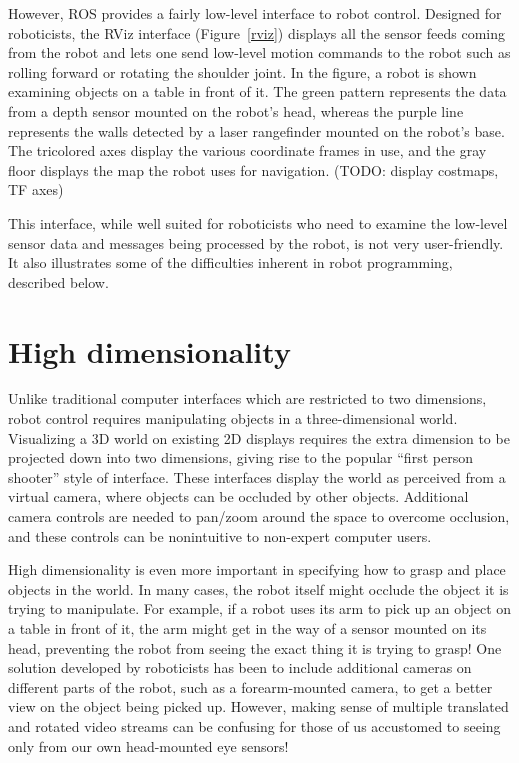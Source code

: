 \documentclass[11pt,twocolumn]{article}
\begin{document}
However, ROS provides a fairly low-level interface to robot control. Designed for roboticists, the RViz interface (Figure~\ref{rviz}) displays all the sensor feeds coming from the robot and lets one send low-level motion commands to the robot such as rolling forward or rotating the shoulder joint. In the figure, a robot is shown examining objects on a table in front of it. The green pattern represents the data from a depth sensor mounted on the robot's head, whereas the purple line represents the walls detected by a laser rangefinder mounted on the robot's base. The tricolored axes display the various coordinate frames in use, and the gray floor displays the map the robot uses for navigation. (TODO: display costmaps, TF axes)

This interface, while well suited for roboticists who need to examine the low-level sensor data and messages being processed by the robot, is not very user-friendly. It also illustrates some of the difficulties inherent in robot programming, described below.

\section{High dimensionality}


Unlike traditional computer interfaces which are restricted to two dimensions, robot control requires manipulating objects in a three-dimensional world. Visualizing a 3D world on existing 2D displays requires the extra dimension to be projected down into two dimensions, giving rise to the popular ``first person shooter'' style of interface. These interfaces display the world as perceived from a virtual camera, where objects can be occluded by other objects. Additional camera controls are needed to pan/zoom around the space to overcome occlusion, and these controls can be nonintuitive to non-expert computer users.

High dimensionality is even more important in specifying how to grasp and place objects in the world.  In many cases, the robot itself might occlude the object it is trying to manipulate. For example, if a robot uses its arm to pick up an object on a table in front of it, the arm might get in the way of a sensor mounted on its head, preventing the robot from seeing the exact thing it is trying to grasp! One solution developed by roboticists has been to include additional cameras on different parts of the robot, such as a forearm-mounted camera, to get a better view on the object being picked up. However, making sense of multiple translated and rotated video streams can be confusing for those of us accustomed to seeing only from our own head-mounted eye sensors!
\end{document}
